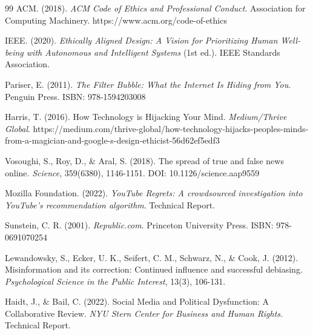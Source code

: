 \begin{thebibliography}{99}
ACM. (2018). \textit{ACM Code of Ethics and Professional Conduct}. Association for Computing Machinery. https://www.acm.org/code-of-ethics

IEEE. (2020). \textit{Ethically Aligned Design: A Vision for Prioritizing Human Well-being with Autonomous and Intelligent Systems} (1st ed.). IEEE Standards Association.

Pariser, E. (2011). \textit{The Filter Bubble: What the Internet Is Hiding from You}. Penguin Press. ISBN: 978-1594203008

Harris, T. (2016). How Technology is Hijacking Your Mind. \textit{Medium/Thrive Global}. https://medium.com/thrive-global/how-technology-hijacks-peoples-minds-from-a-magician-and-google-s-design-ethicist-56d62ef5edf3

Vosoughi, S., Roy, D., \& Aral, S. (2018). The spread of true and false news online. \textit{Science}, 359(6380), 1146-1151. DOI: 10.1126/science.aap9559

Mozilla Foundation. (2022). \textit{YouTube Regrets: A crowdsourced investigation into YouTube's recommendation algorithm}. Technical Report.

Sunstein, C. R. (2001). \textit{Republic.com}. Princeton University Press. ISBN: 978-0691070254

Lewandowsky, S., Ecker, U. K., Seifert, C. M., Schwarz, N., & Cook, J. (2012). Misinformation and its correction: Continued influence and successful debiasing. \textit{Psychological Science in the Public Interest}, 13(3), 106-131.

Haidt, J., & Bail, C. (2022). Social Media and Political Dysfunction: A Collaborative Review. \textit{NYU Stern Center for Business and Human Rights}. Technical Report.

\end{thebibliography}

\newpage
